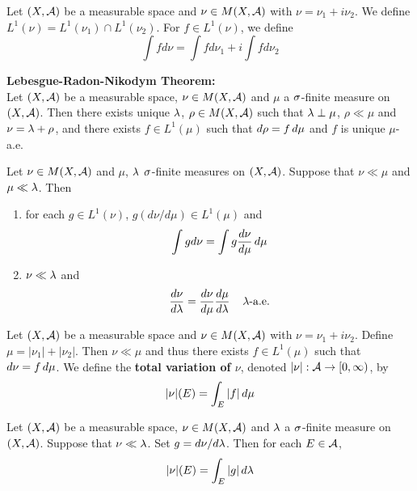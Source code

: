 \documentclass{book}
\begin{document}
	\begin{defn}  
		Let $(X,\mathcal{A})$ be a measurable space and $\nu \in M(X, \mathcal{A})$ with $\nu = \nu_1 + i\nu_2$. We define $L^1(\nu) = L^1(\nu_1)\cap L^1(\nu_2)$. For $f \in L^1(\nu)$, we define $$\int f d\nu = \int fd\nu_1 + i \int f d \nu_2$$
	\end{defn}
	
	\begin{thm}\textbf{Lebesgue-Radon-Nikodym Theorem:}\\
		Let $(X,\mathcal{A})$ be a measurable space, $\nu \in M(X, \mathcal{A})$ and $\mu$ a $\sigma$-finite measure on $(X, \mathcal{A})$. Then there exists unique $\lambda$, $\rho \in M(X, \mathcal{A})$ such that $\lambda \perp \mu$, $\rho \ll \mu$ and $\nu = \lambda + \rho$, and there exists $f \in L^1(\mu)$ such that $d\rho = f \, d \mu$ and $f$ is unique $\mu$-a.e.  
	\end{thm}
	
	\begin{ex}  
		Let $\nu \in M(X, \mathcal{A})$ and $\mu$, $\lambda$ $\sigma$-finite measures on $(X,\mathcal{A})$. Suppose that $\nu \ll \mu$ and $\mu \ll \lambda$. Then 
		\begin{enumerate}
			\item for each $g \in L^1(\nu)$, $g(d\nu/d\mu) \in  L^1(\mu)$ and $$\int g d\nu = \int g \frac{d\nu}{d\mu} \, d \mu$$
			\item $\nu \ll \lambda$ and $$\frac{d \nu}{d\lambda} = \frac{d \nu}{d\mu} \frac{d\mu}{d\lambda} \hspace{4mm} \lambda \text{-a.e.}$$
		\end{enumerate}
	\end{ex}
	
	\begin{defn} 
	Let $(X,\mathcal{A})$ be a measurable space and $\nu \in M(X,\mathcal{A})$ with $ \nu = \nu_1 + i \nu_2$. Define $\mu = |\nu_1| + |\nu_2|$. Then $\nu \ll \mu$ and thus there exists $f \in L^1(\mu)$ such that $d\nu = f \, d \mu$. We define the \textbf{total variation of $\nu$}, denoted $|\nu|: \mathcal{A} \rightarrow [0,\infty)$, by $$|\nu|(E) = \int_E |f|\, d \mu$$ 
	\end{defn}
	
	\begin{ex}  
	Let $(X,\mathcal{A})$ be a measurable space, $\nu \in M(X,\mathcal{A})$ and $\lambda$ a $\sigma$-finite measure on $(X, \mathcal{A})$. Suppose that $\nu \ll \lambda$. Set $g = d\nu / d\lambda$. Then for each $E \in \mathcal{A}$, $$|\nu|(E) = \int_E |g| \, d \lambda$$
	\end{ex}
	
\end{document}
